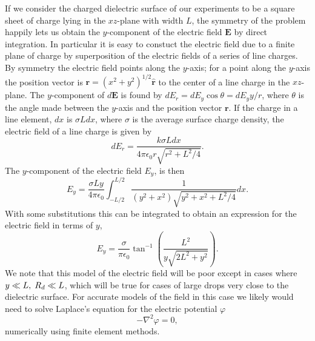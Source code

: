\documentclass[a4paper, 12pt]{article}
\begin{document}
If we consider the charged dielectric surface of our experiments to be a square sheet of charge lying in the $xz$-plane with width $L$, the symmetry of the problem happily lets us obtain the $y$-component of the electric field $\mathbf{E}$ by direct integration. In particular it is easy to constuct the electric field due to a finite plane of charge by superposition of the electric fields of a series of line charges. By symmetry the electric field points along the $y$-axis; for a point along the $y$-axis the position vector is $\mathbf{r} = \left( x^2 + y^2 \right)^{1/2} \hat{\mathbf{r}}$ to the center of a line charge in the $xz$-plane. The $y$-component of $d\mathbf{E}$ is found by $d E_r = d E_y \cos \theta = d E_y y/ r$, where $\theta$ is the angle made between the $y$-axis and the position vector $\mathbf{r}$. If the charge in a line element, $dx$ is $\sigma L dx$, where $\sigma$ is the average surface charge density, the electric field of a line charge is given by \cite{david_j._griffiths_introduction_1999}
\[d E_r = \frac{k \sigma L dx}{4 \pi \epsilon_0 r \sqrt{r^2 + L^2/4}}.
\]
The $y$-component of the electric field $E_y$, is then
\[ E_y = \frac{\sigma L y }{4 \pi \epsilon_0} \int^{L/2}_{-L/2} \frac{1}{(y^2 + x^2) \sqrt{y^2 + x^2 + L^2/4}} dx 
.\]
With some substitutions this can be integrated to obtain an expression for the electric field in terms of $y$, 
\begin{equation}
E_y = \frac{\sigma}{ \pi \epsilon_0} \tan^{-1} \left( \frac{L^2}{y \sqrt{2L^2 + y^2}}\right)
.\end{equation}
We note that this model of the electric field will be poor except in cases where $y \ll L, \hspace{1 mm} R_d \ll L$, which will be true for cases of large drops very close to the dielectric surface. For accurate models of the field in this case we likely would need to solve Laplace's equation for the electric potential $\varphi$
\[ - \nabla^2 \varphi = 0,\]
numerically using finite element methods.
\end{document}
